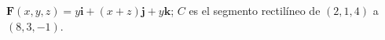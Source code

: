 \item $\mathbf{F}(x,y,z) = y\mathbf{i} + (x + z)\mathbf{j} + y\mathbf{k}$; $C$ es el segmento rectilíneo de $(2, 1, 4)$ a $(8, 3, -1)$.
